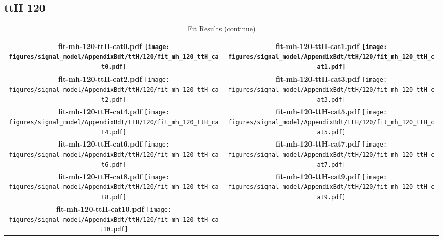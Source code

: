 \subsection{ttH 120}
\begin{longtable}{|c|c|}
\caption{Fit Results}
\endfirsthead
\caption{Fit Results (continue)}
\endhead
\hline
\parbox{0.47\textwidth}{
\centering
{\bfseries fit-mh-120-ttH-cat0.pdf}
\texttt{[image: figures/signal\_model/AppendixBdt/ttH/120/fit\_mh\_120\_ttH\_cat0.pdf]}
}
 & \parbox{0.47\textwidth}{
\centering
{\bfseries fit-mh-120-ttH-cat1.pdf}
\texttt{[image: figures/signal\_model/AppendixBdt/ttH/120/fit\_mh\_120\_ttH\_cat1.pdf]}
}
 \\
\hline
\parbox{0.47\textwidth}{
\centering
{\bfseries fit-mh-120-ttH-cat2.pdf}
\texttt{[image: figures/signal\_model/AppendixBdt/ttH/120/fit\_mh\_120\_ttH\_cat2.pdf]}
}
 & \parbox{0.47\textwidth}{
\centering
{\bfseries fit-mh-120-ttH-cat3.pdf}
\texttt{[image: figures/signal\_model/AppendixBdt/ttH/120/fit\_mh\_120\_ttH\_cat3.pdf]}
}
 \\
\hline
\parbox{0.47\textwidth}{
\centering
{\bfseries fit-mh-120-ttH-cat4.pdf}
\texttt{[image: figures/signal\_model/AppendixBdt/ttH/120/fit\_mh\_120\_ttH\_cat4.pdf]}
}
 & \parbox{0.47\textwidth}{
\centering
{\bfseries fit-mh-120-ttH-cat5.pdf}
\texttt{[image: figures/signal\_model/AppendixBdt/ttH/120/fit\_mh\_120\_ttH\_cat5.pdf]}
}
 \\
\hline
\parbox{0.47\textwidth}{
\centering
{\bfseries fit-mh-120-ttH-cat6.pdf}
\texttt{[image: figures/signal\_model/AppendixBdt/ttH/120/fit\_mh\_120\_ttH\_cat6.pdf]}
}
 & \parbox{0.47\textwidth}{
\centering
{\bfseries fit-mh-120-ttH-cat7.pdf}
\texttt{[image: figures/signal\_model/AppendixBdt/ttH/120/fit\_mh\_120\_ttH\_cat7.pdf]}
}
 \\
\hline
\parbox{0.47\textwidth}{
\centering
{\bfseries fit-mh-120-ttH-cat8.pdf}
\texttt{[image: figures/signal\_model/AppendixBdt/ttH/120/fit\_mh\_120\_ttH\_cat8.pdf]}
}
 & \parbox{0.47\textwidth}{
\centering
{\bfseries fit-mh-120-ttH-cat9.pdf}
\texttt{[image: figures/signal\_model/AppendixBdt/ttH/120/fit\_mh\_120\_ttH\_cat9.pdf]}
}
 \\
\hline
\parbox{0.47\textwidth}{
\centering
{\bfseries fit-mh-120-ttH-cat10.pdf}
\texttt{[image: figures/signal\_model/AppendixBdt/ttH/120/fit\_mh\_120\_ttH\_cat10.pdf]}
}
\end{longtable}
